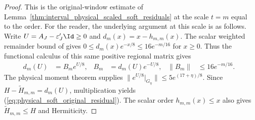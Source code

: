 \begin{proof}\leanok
    This is the original-window estimate of
    Lemma~\ref{thm:interval_physical_scaled_soft_residuals} at the
    scale $t=m$ equal to the order. For the reader, the underlying argument
    at this scale is as follows. Write $U=A_J-\varepsilon'_J\Id\ge0$ and
    $d_m(x)=x-h_{m,m}(x)$. The scalar weighted remainder bound of
    \cite{QICLean2026Blueprint} gives
    $0\le d_m(x)e^{-x/8}\le16e^{-m/16}$ for $x\ge0$.
    Thus the functional calculus of this same positive regional matrix gives
    \begin{align*}
        d_m(U) & =B_me^{U/8},     &
        B_m    & =d_m(U)e^{-U/8}, & \|B_m\| & \le16e^{-m/16}.
    \end{align*}
    The physical moment theorem supplies
    $\|e^{U/8}|_{G_\eta}\|\le5e^{(17+\eta)/8}$.
    Since $H-\widetilde H_{m,m}=d_m(U)$, multiplication yields
    (\ref{eq:physical_soft_original_residual}).
    The scalar order $h_{m,m}(x)\le x$ also gives
    $\widetilde H_{m,m}\le H$ and Hermiticity.
\end{proof}
